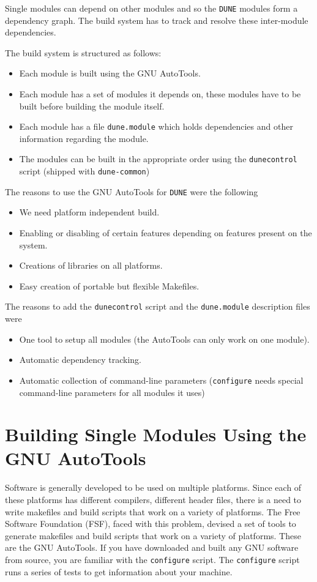 \documentclass[11pt,a4paper,headinclude,footinclude,DIV16,normalheadings]{scrartcl}
\newcommand{\dune}{\texttt{DUNE}\xspace}
\newcommand{\configure}{\texttt{configure}\xspace}
\newcommand{\dunecommon}{\texttt{dune-common}\xspace}
\newcommand{\dunecontrol}{\texttt{dunecontrol}\xspace}
\newcommand{\dunemodule}{\texttt{dune.module}\xspace}
\begin{document}
Single modules can depend on other modules and so the \dune modules
form a dependency graph.  The build system has to track and resolve
these inter-module dependencies.

The build system is structured as follows:
\begin{itemize}
\item Each module is built using the GNU AutoTools.
\item Each module has a set of modules it depends on, these modules
  have to be built before building the module itself.
\item Each module has a file \dunemodule which holds dependencies and
  other information regarding the module.
\item The modules can be built in the appropriate order using the
  \dunecontrol script (shipped with \dunecommon)
\end{itemize}

The reasons to use the GNU AutoTools for \dune were the following
\begin{itemize}
\item We need platform independent build.
\item Enabling or disabling of certain features depending on
  features present on the system.
\item Creations of libraries on all platforms.
\item Easy creation of portable but flexible Makefiles.
\end{itemize}

The reasons to add the \dunecontrol script and the \dunemodule
description files were
\begin{itemize}
\item One tool to setup all modules (the AutoTools can only work on one
  module).
\item Automatic dependency tracking.
\item Automatic collection of command-line parameters (\configure needs
  special command-line parameters for all modules it uses)
\end{itemize}

\section{Building Single Modules Using the GNU AutoTools}

Software is generally developed to be used on multiple
platforms. Since each of these platforms has different compilers,
different header files, there is a need to write makefiles and build
scripts that work on a variety of platforms. The Free
Software Foundation (FSF), faced with this problem, devised a
set of tools to generate makefiles and build scripts that work on a
variety of platforms. These are the GNU AutoTools. 
If you have downloaded and built any GNU
software from source, you are familiar with the \configure script. The
\configure script runs a series of tests to get information about
your machine.
\end{document}
